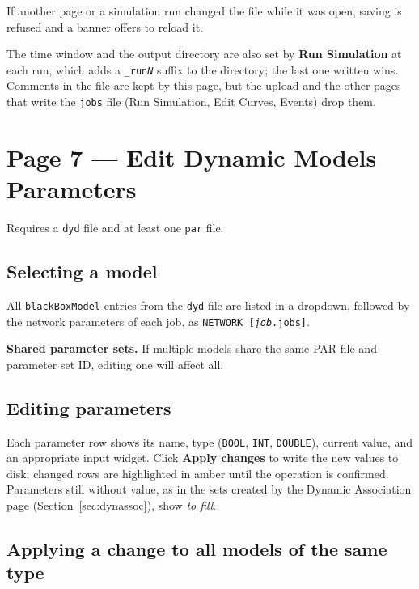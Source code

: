 \documentclass[a4paper,11pt]{article}
\newcommand{\code}[1]{\texttt{\small #1}}
\newcommand{\ftype}[1]{\texttt{\small\color{rteblu}#1}}
\begin{document}
If another page or a simulation run changed the file while it was open,
saving is refused and a banner offers to reload it.

\begin{notebox}
The time window and the output directory are also set by \textbf{Run
Simulation} at each run, which adds a \code{\_run\textit{N}} suffix to the
directory; the last one written wins. Comments in the file are kept by this
page, but the upload and the other pages that write the \ftype{jobs} file
(Run Simulation, Edit Curves, Events) drop them.
\end{notebox}

\section{Page 7 --- Edit Dynamic Models Parameters}
\label{sec:editparams}

Requires a \ftype{dyd} file and at least one \ftype{par} file.

\subsection{Selecting a model}

All \code{blackBoxModel} entries from the \ftype{dyd} file are listed in a
dropdown, followed by the network parameters of each job, as
\code{NETWORK [\textit{job}.jobs]}.

\begin{warnbox}
\textbf{Shared parameter sets.} If multiple models share the same PAR file and
parameter set ID, editing one will affect all.
\end{warnbox}

\subsection{Editing parameters}

Each parameter row shows its name, type (\code{BOOL}, \code{INT},
\code{DOUBLE}), current value, and an appropriate input widget. Click
\textbf{Apply changes} to write the new values to disk; changed rows are
highlighted in amber until the operation is confirmed. Parameters still without
value, as in the sets created by the Dynamic Association page
(Section~\ref{sec:dynassoc}), show \emph{to fill}.

\subsection{Applying a change to all models of the same type}
\end{document}
